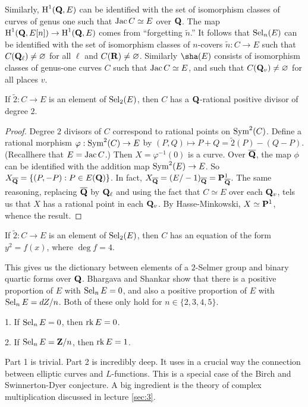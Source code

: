 Similarly, $\operatorname{H}^1(\mathbf{Q},E)$ can be identified with the set of isomorphism classes 
of curves of genus one such that $\operatorname{Jac} C\simeq E$ over $\mathbf{Q}$. The map 
$\operatorname{H}^1(\mathbf{Q},E[n]) \to \operatorname{H}^1(\mathbf{Q},E)$ comes from ``forgetting $\widetilde n$.'' 
It follows that $\operatorname{Sel}_n(E)$ can be identified with the set of isomorphism 
classes of $n$-covers $\widetilde n:C\to E$ such that 
$C(\mathbf{Q}_\ell)\ne \varnothing$ for all $\ell$ and $C(\mathbf{R})\ne\varnothing$. 
Similarly $\sha(E)$ consists of isomorphism classes of genus-one curves $C$ 
such that $\operatorname{Jac} C\simeq E$, and such that $C(\mathbf{Q}_v)\ne\varnothing$ for all 
places $v$. 

\begin{theo}
If $\widetilde 2:C\to E$ is an element of $\operatorname{Sel}_2(E)$, then $C$ has a 
$\mathbf{Q}$-rational positive divisor of degree $2$. 
\end{theo}
\begin{proof}
Degree $2$ divisors of $C$ correspond to rational points on 
$\operatorname{Sym}^2(C)$. Define a rational morphism 
$\varphi:\operatorname{Sym}^2(C) \to E$ by $(P,Q)\mapsto P+Q = \widetilde 2(P)-(Q-P)$. 
(Recallhere that $E=\operatorname{Jac} C$.) Then $X=\varphi^{-1}(0)$ is a curve. Over 
$\overline{\mathbf{Q}}$, the map $\phi$ can be identified with the addition map 
$\operatorname{Sym}^2(E) \to E$. So $X_{\overline{\mathbf{Q}}}=\{(P,-P):P\in E(\mathbf{Q})\}$. In fact, 
$X_{\overline{\mathbf{Q}}}=(E/-1)_{\overline{\mathbf{Q}}}=\mathbf{P}^1_{\overline{\mathbf{Q}}}$. The same 
reasoning, replacing $\overline{\mathbf{Q}}$ by $\mathbf{Q}_\ell$ and using the fact that 
$C\simeq E$ over each $\mathbf{Q}_v$, tels us that $X$ has a rational point in each 
$\mathbf{Q}_v$. By Hasse-Minkowski, $X\simeq \mathbf{P}^1$, whence the result. 
\end{proof}

\begin{coro}
If $\widetilde 2:C\to E$ is an element of $\operatorname{Sel}_2(E)$, then $C$ has an 
equation of the form $y^2=f(x)$, where $\deg f=4$. 
\end{coro}

This gives us the dictionary between elements of a $2$-Selmer group and 
binary quartic forms over $\mathbf{Q}$. Bhargava and Shankar show that there is a 
positive proportion of $E$ with $\operatorname{Sel}_n E=0$, and also a positive proportion 
of $E$ with $\operatorname{Sel}_n E=dZ/n$. Both of these only hold for $n\in \{2,3,4,5\}$. 

\begin{theo}
1. If $\operatorname{Sel}_n E=0$, then $\operatorname{rk} E=0$. 

2. If $\operatorname{Sel}_n E=\mathbf{Z}/n$, then $\operatorname{rk} E=1$. 
\end{theo}

Part 1 is trivial. Part 2 is incredibly deep. It uses in a crucial way the 
connection between elliptic curves and $L$-functions. This is a special case of 
the Birch and Swinnerton-Dyer conjecture. A big ingredient is the theory of 
complex multiplication discussed in lecture \ref{sec:3}.




